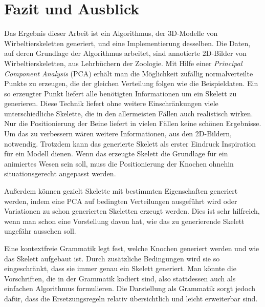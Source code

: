 \chapter{Fazit und Ausblick}
\label{chapter:conclusion}

% 
% 

Das Ergebnis dieser Arbeit ist ein Algorithmus, der 3D-Modelle von Wirbeltierskeletten generiert, und eine Implementierung desselben. Die Daten, auf deren Grundlage der Algorithmus arbeitet, sind annotierte 2D-Bilder von Wirbeltierskeletten, \zb aus Lehrbüchern der Zoologie. 
Mit Hilfe einer \emph{Principal Component Analysis} (PCA) erhält man die Möglichkeit zufällig normalverteilte Punkte zu erzeugen, die der gleichen Verteilung folgen wie die Beispieldaten.
Ein so erzeugter Punkt liefert alle benötigten Informationen um ein Skelett zu generieren.
Diese Technik liefert ohne weitere Einschränkungen viele unterschiedliche Skelette, die in den allermeisten Fällen auch realistisch wirken.\\
Nur die Positionierung der Beine liefert in vielen Fällen keine schönen Ergebnisse. Um das zu verbessern wären weitere Informationen, \zb aus den 2D-Bildern, notwendig. Trotzdem kann das generierte Skelett als erster Eindruck \bzw Inspiration für ein Modell dienen. Wenn das erzeugte Skelett die Grundlage für ein animiertes Wesen sein soll, muss die Positionierung der Knochen ohnehin situationsgerecht angepasst werden.

Außerdem können gezielt Skelette mit bestimmten Eigenschaften generiert werden, indem eine PCA auf bedingten Verteilungen ausgeführt wird oder Variationen zu schon generierten Skeletten erzeugt werden. Dies ist sehr hilfreich, wenn man schon eine Vorstellung davon hat, wie das zu generierende Skelett ungefähr aussehen soll.

Eine kontextfreie Grammatik legt fest, welche Knochen generiert werden und wie das Skelett aufgebaut ist.
Durch zusätzliche Bedingungen wird sie so eingeschränkt, dass sie immer genau ein Skelett generiert. Man könnte die Vorschriften, die in der Grammatik kodiert sind, also stattdessen auch als einfachen Algorithmus formulieren.
Die Darstellung als Grammatik sorgt jedoch dafür, dass die Ersetzungsregeln relativ übersichtlich und leicht erweiterbar sind. 

